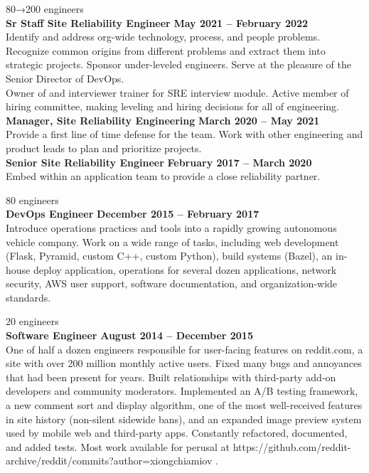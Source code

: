 \documentclass[margin,line]{resume}
\begin{document}
\begin{resume}
     \hfill
    {\selectfont\texttildelow}80→200 engineers
    \vspace{1mm}\\%
    \textbf{Sr Staff Site Reliability Engineer} \hfill \textbf{May 2021 -- February 2022}\\
    Identify and address org-wide technology, process, and people problems. Recognize common origins from different problems and extract them into strategic projects. Sponsor under-leveled engineers. Serve at the pleasure of the Senior Director of DevOps.\\
    Owner of and interviewer trainer for SRE interview module.  Active member of hiring committee, making leveling and hiring decisions for all of engineering.\vspace{1mm}\\
    \textbf{Manager, Site Reliability Engineering} \hfill \textbf{March 2020 -- May 2021}\\
    Provide a first line of time defense for the team.  Work with other engineering and product leads to plan and prioritize projects.\vspace{1mm}\\
    \textbf{Senior Site Reliability Engineer} \hfill \textbf{February 2017 -- March 2020}\\
    Embed within an application team to provide a close reliability partner.

     \hfill {\selectfont\texttildelow}80 engineers
    \vspace{1mm}\\%
    \textbf{DevOps Engineer} \hfill \textbf{December 2015 -- February 2017}\\
    Introduce operations practices and tools into a rapidly growing autonomous vehicle company.
    Work on a wide range of tasks, including web development (Flask, Pyramid, custom C++, custom Python), build systems (Bazel), an in-house deploy application, operations for several dozen applications, network security, AWS user support, software documentation, and organization-wide standards.

     \hfill {\selectfont\texttildelow}20 engineers
    \vspace{1mm}\\%
    \textbf{Software Engineer} \hfill \textbf{August 2014 -- December 2015}\\
    One of half a dozen engineers responsible for user-facing features on reddit.com, a site with over 200 million monthly active users.
    Fixed many bugs and annoyances that had been present for years.
    Built relationships with third-party add-on developers and community moderators.
    Implemented an A/B testing framework, a new comment sort and display algorithm, one of the most well-received features in site history (non-silent sidewide bans), and an expanded image preview system used by mobile web and third-party apps.
    Constantly refactored, documented, and added tests.
    Most work available for perusal at https://github.com/reddit-archive/reddit/commits?author=xiongchiamiov .


\end{resume}
\end{document}
